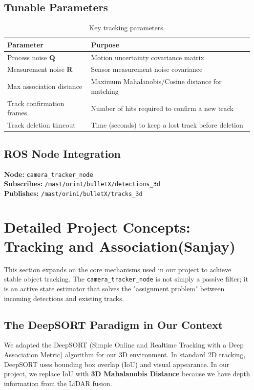 \documentclass[12pt,a4paper]{report}
\begin{document}
{\subsection{Tunable Parameters}
\begin{table}[H]
\centering
\caption{Key tracking parameters.}
\label{tab:tracking-params}
\begin{tabularx}{\textwidth}{@{}l X@{}}
\toprule
\textbf{Parameter} & \textbf{Purpose} \\
\midrule
Process noise $\mathbf{Q}$ & Motion uncertainty covariance matrix \\
Measurement noise $\mathbf{R}$ & Sensor measurement noise covariance \\
Max association distance & Maximum Mahalanobis/Cosine distance for matching \\
Track confirmation frames & Number of hits required to confirm a new track \\
Track deletion timeout & Time (seconds) to keep a lost track before deletion \\
\bottomrule
\end{tabularx}
\end{table}

\subsection{ROS Node Integration}
\textbf{Node:} \texttt{camera\_tracker\_node} \\
\textbf{Subscribes:} \texttt{/mast/orin1/bulletX/detections\_3d} \\
\textbf{Publishes:} \texttt{/mast/orin1/bulletX/tracks\_3d}

\section{Detailed Project Concepts: Tracking and Association(Sanjay)}
This section expands on the core mechanisms used in our project to achieve stable object tracking. The \texttt{camera\_tracker\_node} is not simply a passive filter; it is an active state estimator that solves the "assignment problem" between incoming detections and existing tracks.

\subsection{The DeepSORT Paradigm in Our Context}
We adapted the DeepSORT (Simple Online and Realtime Tracking with a Deep Association Metric) algorithm for our 3D environment. In standard 2D tracking, DeepSORT uses bounding box overlap (IoU) and visual appearance. In our project, we replace IoU with \textbf{3D Mahalanobis Distance} because we have depth information from the LiDAR fusion. 

}
\end{document}
